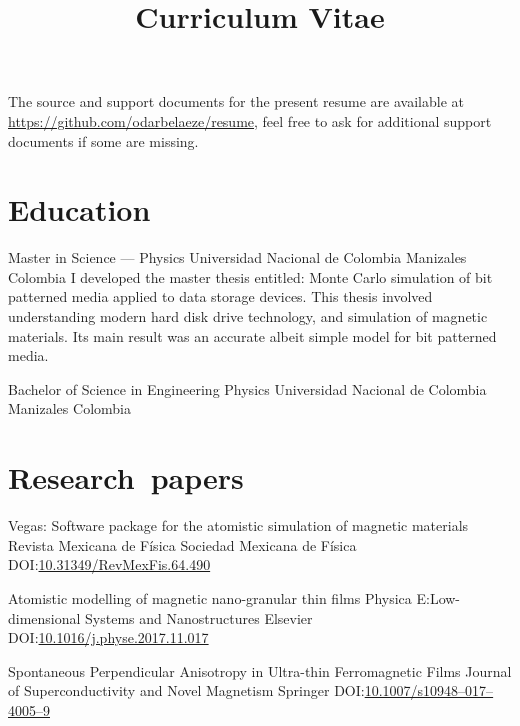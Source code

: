 \documentclass[12pt,english]{moderncv}
\title{Curriculum Vitae}
\begin{document}
\maketitle

\begin{centering}
    The source and support documents for the present resume are available at
    \url{https://github.com/odarbelaeze/resume}, feel free to ask for
    additional support documents if some are missing.
\end{centering}


\section{Education}

        {Master in Science --- Physics}
        {Universidad Nacional de Colombia}
        {Manizales}
        {Colombia}
        {%
            I developed the master thesis entitled: Monte Carlo simulation of
            bit patterned media applied to data storage devices. This thesis
            involved understanding modern hard disk drive technology, and
            simulation of magnetic materials. Its main result was an accurate
            albeit simple model for bit patterned media.
        }

        {Bachelor of Science in Engineering Physics}
        {Universidad Nacional de Colombia}
        {Manizales}
        {Colombia}
        {}


\section{Research~papers}

        {Vegas: Software package for the atomistic simulation of magnetic materials}
        {Revista Mexicana de Física}
        {Sociedad Mexicana de Física}
        {}
        {DOI:\@ \href{https://doi.org/10.31349/RevMexFis.64.490}{10.31349/RevMexFis.64.490}}

        {Atomistic modelling of magnetic nano-granular thin films}
        {Physica E:\@ Low-dimensional Systems and Nanostructures}
        {Elsevier}
        {}
        {DOI:\@ \href{https://doi.org/10.1016/j.physe.2017.11.017}{10.1016/j.physe.2017.11.017}}

        {%
            Spontaneous Perpendicular Anisotropy in Ultra-thin Ferromagnetic
            Films%
        }
        {Journal of Superconductivity and Novel Magnetism}
        {Springer}
        {}
        {DOI:\@ \href{https://doi.org/10.1007/s10948-017-4005-9}{10.1007/s10948--017--4005--9}}
\end{document}

